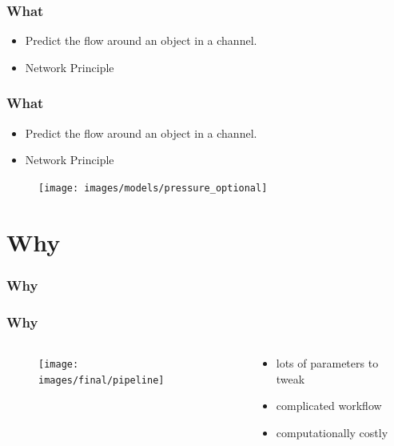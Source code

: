 \documentclass[18pt, xcolor=table]{beamer}
\begin{document}
\begin{frame}[t]
  \frametitle{What}
  \begin{itemize}
  \item Predict the flow around an object in a channel.
  \item Network Principle
  \end{itemize}

\end{frame}


\begin{frame}[t]
  \frametitle{What}

  \begin{itemize}
  \item Predict the flow around an object in a channel.
  \item Network Principle
  \end{itemize}

  \begin{figure}[htb]
    \texttt{[image: images/models/pressure\_optional]}
  \end{figure}

\end{frame}

\section{Why}

\begin{frame}[t]
  \frametitle{Why}

\end{frame}

\begin{frame}
  \frametitle{Why}

  \begin{columns}[t]
    \begin{column}{0.5\textwidth}

      \vspace{-0.5cm}
      \begin{center}
        \begin{figure}[htb]
          \texttt{[image: images/final/pipeline]}
        \end{figure}
      \end{center}


    \end{column}
    \begin{column}{0.5\textwidth}
      \begin{itemize}
      \item lots of parameters to tweak
      \item complicated workflow
      \item computationally costly
      \end{itemize}
    \end{column}
  \end{columns}
\end{frame}
\end{document}
